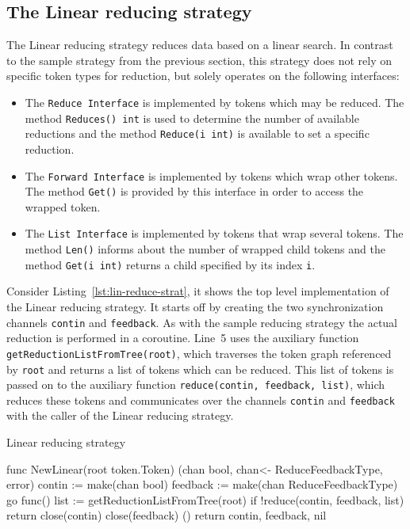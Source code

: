 \subsection{The Linear reducing strategy}
\label{sec:linear-reduce-strategy}

The Linear reducing strategy reduces data based on a linear search. In contrast to the sample strategy from the previous section, this strategy does not rely on specific token types for reduction, but solely operates on the following interfaces:

\begin{itemize}
\item The \texttt{Reduce Interface} is implemented by tokens which may be reduced. The method \texttt{Reduces() int} is used to determine the number of available reductions and the method \texttt{Reduce(i int)} is available to set a specific reduction.
\item The \texttt{Forward Interface} is implemented by tokens which wrap other tokens. The method \texttt{Get()} is provided by this interface in order to access the wrapped token.
\item The \texttt{List Interface} is implemented by tokens that wrap several tokens. The method \texttt{Len()} informs about the number of wrapped child tokens and the method \texttt{Get(i int)} returns a child specified by its index \texttt{i}.
\end{itemize}

Consider Listing~\ref{lst:lin-reduce-strat}, it shows the top level implementation of the Linear reducing strategy. It starts off by creating the two synchronization channels \texttt{contin} and \texttt{feedback}. As with the sample reducing strategy the actual reduction is performed in a coroutine. Line~5 uses the auxiliary function \texttt{getReductionListFromTree(root)}, which traverses the token graph referenced by \texttt{root} and returns a list of tokens which can be reduced. This list of tokens is passed on to the auxiliary function \texttt{reduce(contin, feedback, list)}, which reduces these tokens and communicates over the channels \texttt{contin} and \texttt{feedback} with the caller of the Linear reducing strategy.

\begin{listing}[ht]
\caption{Linear reducing strategy}
\label{lst:lin-reduce-strat}
\begin{gocode}
func NewLinear(root token.Token) (chan bool, chan<- ReduceFeedbackType, error) {
	contin := make(chan bool)
	feedback := make(chan ReduceFeedbackType)
	go func() {
		list := getReductionListFromTree(root)
		if !reduce(contin, feedback, list) {
			return
		}
		close(contin)
		close(feedback)
	}()
	return contin, feedback, nil
}
\end{gocode}
\end{listing}

